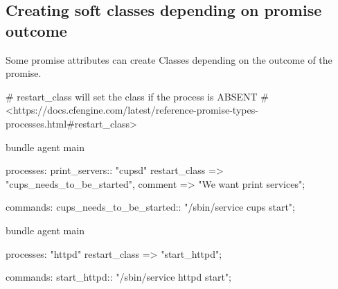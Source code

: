 \subsection{Creating soft classes depending on promise outcome}

Some promise attributes can create Classes depending on the outcome of
the promise.

\begin{codelisting}
\begin{code}
# restart_class will set the class if the process is ABSENT
# <https://docs.cfengine.com/latest/reference-promise-types-processes.html#restart_class>

bundle agent main
{
  processes:
    print_servers::
      "cupsd"
        restart_class => "cups_needs_to_be_started",
        comment => "We want print services";

  commands:
    cups_needs_to_be_started::
      "/sbin/service cups start";
}
\end{code}
\end{codelisting}
\begin{codelisting}
\begin{code}
bundle agent main
{
  processes:
      "httpd"
        restart_class => "start_httpd";

  commands:
    start_httpd::
      "/sbin/service httpd start";
}
\end{code}
\end{codelisting}